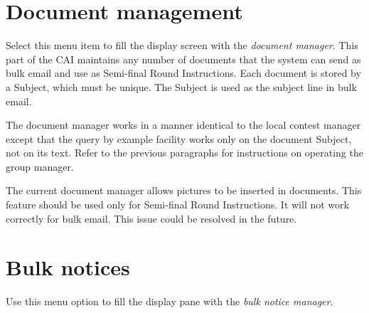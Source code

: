 \documentclass[11pt,letterpaper]{refart}
\begin{document}
\section{Document management}
Select this menu item to fill the display screen with the \emph{document 
manager}.  This part of the CAI maintains any number of documents that 
the system can send as bulk email and use as Semi-final Round Instructions.
Each document is stored by a Subject, which must be unique.  The Subject
is used as the subject line in bulk email.

The document manager works in a manner identical to the local contest
manager except that the query by example facility works only on the
document Subject, not on its text.  Refer to the previous
paragraphs for instructions on operating the group manager.

The current document manager allows pictures to be inserted in documents.
This feature should be used only for Semi-final Round Instructions.  It will
not work correctly for bulk email.  This issue could be resolved in the future.

\section{Bulk notices}
Use this menu option to fill the display pane with the \emph{bulk notice manager}.
\end{document}
